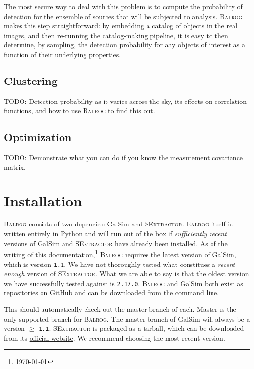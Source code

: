 \documentclass[12pt]{book}
\newcommand{\codett}[1]{\lstinline{#1}}
\newcommand{\py}{Python}
\newcommand{\galsim}{GalSim}
\newcommand{\balrog}{\textsc{Balrog}}
\newcommand{\sex}{\textsc{SExtractor}}
\newcommand{\ericdate}{\mydate\today}
\begin{document}
The most secure way to deal with this problem is to compute the
probability of detection for the ensemble of sources that will be
subjected to analysis. \balrog{} makes this step straightforward: by
embedding a catalog of objects in the real images, and then re-running
the catalog-making pipeline, it is easy to then determine, by
sampling, the detection probability for any objects of interest as a
function of their underlying properties.


\section{Clustering}
TODO: Detection probability as it varies across the sky, its effects
on correlation functions, and how to use \balrog{} to find this out.

\section{Optimization}
TODO: Demonstrate what you can do if you know the measurement
covariance matrix.



\chapter{Installation}
\label{sec:install}

\balrog{} consists of two depencies: \galsim{} and \sex{}.
\balrog{} itself is written entirely in \py{} and will run out of the box if  
\emph{sufficiently recent} versions of \galsim{} and \sex{} have already been installed.
As of the writing of this documentation,\footnote{\label{foot:date}\ericdate} 
\balrog{} requires the latest version of \galsim{}, which is version \codett{1.1}.
We have not thoroughly tested what constitues a \emph{recent enough} version of \sex{}.
What we are able to say is that the oldest version we have successfully tested against is \codett{2.17.0}.
\balrog{} and \galsim{} both exist as repositories on GitHub and can be downloaded 
from the command line.

\begin{cmdline}
\end{cmdline}

\noindent This should automatically check out the master branch of each.
Master is the only supported branch for \balrog{}. 
The master branch of \galsim{} will always be a version $\geq$ \codett{1.1}.
\sex{} is packaged as a tarball, which can be downloaded 
from its \href{https://www.astromatic.net/software/sextractor}{official website}.
We recommend choosing the most recent version.
\end{document}
